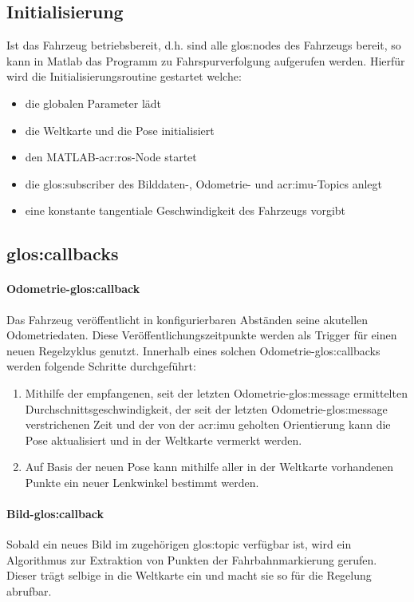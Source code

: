 \subsection{Initialisierung}
Ist das Fahrzeug betriebsbereit, d.h. sind alle \glspl{glos:node} des Fahrzeugs bereit, so kann in Matlab das Programm zu Fahrspurverfolgung aufgerufen werden. Hierfür wird die Initialisierungsroutine gestartet welche:
\begin{itemize}
\item die globalen Parameter lädt
\item die Weltkarte und die Pose initialisiert
\item den MATLAB-\gls{acr:ros}-Node startet
\item die \gls{glos:subscriber} des Bilddaten-, Odometrie- und \gls{acr:imu}-Topics anlegt
\item eine konstante tangentiale Geschwindigkeit des Fahrzeugs vorgibt 
\end{itemize}

\subsection{\glspl{glos:callback}}
\paragraph{Odometrie-\gls{glos:callback}}
Das Fahrzeug veröffentlicht in konfigurierbaren Abständen seine akutellen Odometriedaten. Diese Veröffentlichungszeitpunkte werden als Trigger für einen neuen Regelzyklus genutzt. Innerhalb eines solchen Odometrie-\gls{glos:callback}s werden folgende Schritte durchgeführt:
\begin{enumerate}
\item Mithilfe der empfangenen, seit der letzten Odometrie-\gls{glos:message} ermittelten Durchschnittsgeschwindigkeit, der seit der letzten Odometrie-\gls{glos:message} verstrichenen Zeit und der von der \gls{acr:imu} geholten Orientierung kann die Pose aktualisiert und in der Weltkarte vermerkt werden.
\item Auf Basis der neuen Pose kann mithilfe aller in der Weltkarte vorhandenen Punkte ein neuer Lenkwinkel bestimmt werden.
\end{enumerate}
\paragraph{Bild-\gls{glos:callback}}
Sobald ein neues Bild im zugehörigen \gls{glos:topic} verfügbar ist, wird ein  Algorithmus zur Extraktion von Punkten der Fahrbahnmarkierung gerufen. Dieser trägt selbige in die Weltkarte ein und macht sie so für die Regelung abrufbar.
